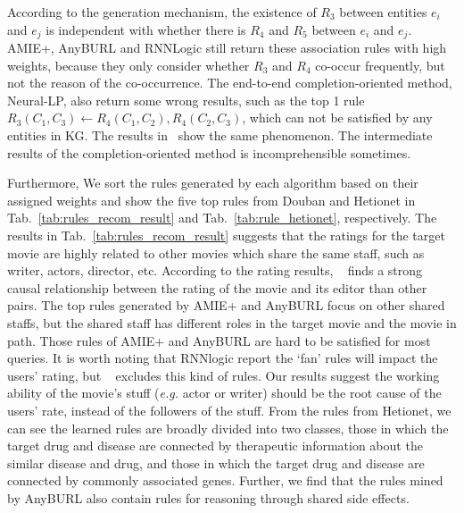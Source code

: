 According to the generation mechanism, the existence of $R_3$ between entities $e_i$ and $e_j$ is independent with whether there is $R_4$ and $R_5$ between $e_i$ and $e_j$.
AMIE+, AnyBURL and RNNLogic still return these association rules with high weights, because they only consider whether $R_3$ and $R_4$ co-occur frequently, but not the reason of the co-occurrence.
The end-to-end completion-oriented method, Neural-LP, also return some wrong results, such as the top 1 rule $R_3(C_1,C_3) \gets R_4(C_1,C_2), R_4(C_2,C_3)$, which can not be satisfied by any entities in KG.
The results in~\cite{sadeghian2019drum} show the same phenomenon.
The intermediate results of the completion-oriented method is incomprehensible sometimes.


Furthermore, We sort the rules generated by each algorithm based on their assigned weights and show the five top rules from Douban and Hetionet in Tab.~\ref{tab:rules_recom_result} and Tab.~\ref{tab:rule_hetionet}, respectively.
The results in Tab.~\ref{tab:rules_recom_result} suggests that the ratings for the target movie are highly related to other movies which share the same staff, such as writer, actors, director, etc.
According to the rating results, \dname~ finds a strong causal relationship between the rating of the movie and its editor than other pairs.
The top rules generated by AMIE+ and AnyBURL focus on other shared staffs, but the shared staff has different roles in the target movie and the movie in path.
Those rules of AMIE+ and AnyBURL are hard to be satisfied for most queries.
It is worth noting that RNNlogic report the `fan' rules  will impact the users' rating, but \dname~ excludes this kind of rules.
Our results suggest the working ability of the movie's stuff ({\it e.g.} actor or writer) should be the root cause of the users' rate, instead of the followers of the stuff.
From the rules from Hetionet, we can see
the learned rules are broadly divided into two classes, those in which the target drug and disease are connected by therapeutic information about the similar disease and drug, and those in which the target drug and disease are connected by commonly associated genes.
Further, we find that the rules mined by AnyBURL also contain rules for reasoning through shared side effects.



